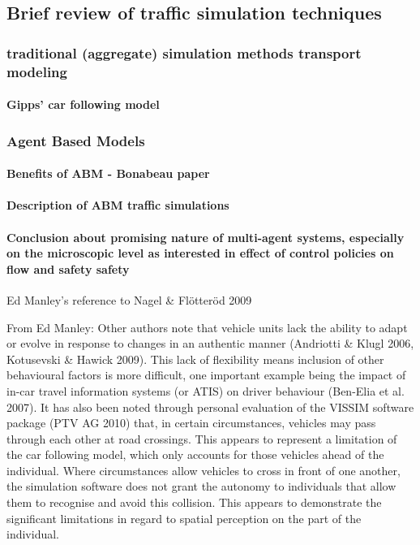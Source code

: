       \subsection{Brief review of traffic simulation techniques}
        
        \subsubsection{traditional (aggregate) simulation methods transport modeling}
          \paragraph{Gipps' car following model}
          
          
        \subsubsection{Agent Based Models}
          \paragraph{Benefits of ABM - Bonabeau paper}
          \paragraph{Description of ABM traffic simulations}

          
        \paragraph{Conclusion about promising nature of multi-agent systems, especially on the  microscopic level as interested in effect of control policies on flow and safety safety}

        Ed Manley's reference to Nagel \& Flötteröd 2009
        
        From Ed Manley: Other authors note that vehicle units lack the ability to adapt or evolve in response to changes in an authentic manner (Andriotti \& Klugl 2006, Kotusevski \& Hawick 2009). This lack of flexibility means inclusion of other behavioural factors is more difficult, one important example being the impact of in-car travel information systems (or ATIS) on driver behaviour (Ben-Elia et al. 2007).
        It has also been noted through personal evaluation of the VISSIM software package (PTV AG 2010) that, in certain circumstances, vehicles may pass through each other at road crossings. This appears to represent a limitation of the car following model, which only accounts for those vehicles ahead of the individual. Where circumstances allow vehicles to cross in front of one another, the simulation software does not grant the autonomy to individuals that allow them to recognise and avoid this collision. This appears to demonstrate the significant limitations in regard to spatial perception on the part of the individual.

